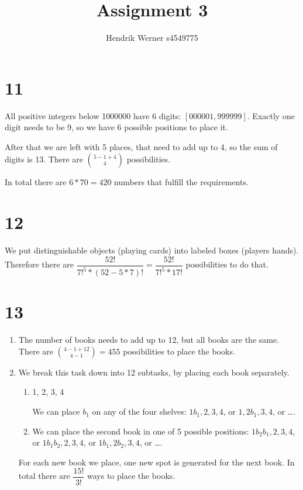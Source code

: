 \documentclass[12pt]{article}
\title{Assignment 3}
\author{
	Hendrik Werner s4549775
}
\begin{document}
\maketitle

\section*{11}
All positive integers below 1000000 have 6 digits: $[000001, 999999]$. Exactly one digit needs to be 9, so we have 6 possible positions to place it.

After that we are left with 5 places, that need to add up to 4, so the sum of digits is 13. There are $\binom{5 - 1 + 4}{4}$ possibilities.

In total there are $6 * 70 = 420$ numbers that fulfill the requirements.

\section*{12}
We put distinguishable objects (playing cards) into labeled boxes (players hands). Therefore there are $\dfrac{52!}{7!^5 * (52 - 5 * 7)!} =  \dfrac{52!}{7!^5 * 17!}$ possibilities to do that.

\section*{13}
\begin{enumerate}[a]
	\item %
	The number of books needs to add up to 12, but all books are the same. There are $\binom{4 - 1 + 12}{4 - 1} = 455$ possibilities to place the books.

	\item %
	We break this task down into 12 subtasks, by placing each book separately.

	\begin{enumerate}
		\item 1, 2, 3, 4

		We can place $b_1$ on any of the four shelves: $1 b_1, 2, 3, 4$, or $1, 2 b_1, 3, 4$, or \dots.
		\item
		We can place the second book in one of 5 possible positions: $1 b_2 b_1, 2, 3, 4$, or $1 b_1 b_2, 2, 3, 4$, or $1 b_1, 2 b_2, 3, 4$, or \dots.
	\end{enumerate}

	For each new book we place, one new spot is generated for the next book. In total there are $\dfrac{15!}{3!}$ ways to place the books.
\end{enumerate}
\end{document}
